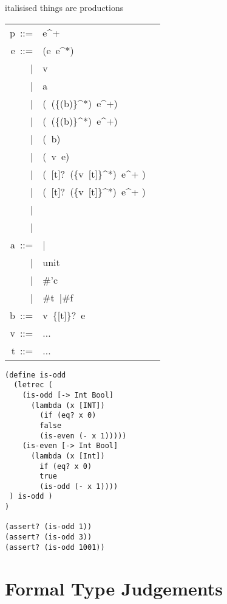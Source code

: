 \documentclass[12pt]{report}
\begin{document}
italisised things are productions
\begin{longtable}{RLR}
      p\ ::= &e^+&\\
      e\ ::= &(e\ e^*)&\\
        |&v&\\
        |&a&\\
        |&(\ (\{(b)\}^*)\ e^+)&\\
        |&(\ (\{(b)\}^*)\ e^+)&\\
        |&(\ b)&\\
        |&(\ v\ e)&\\
        |&(\ [t]?\ (\{v\ [t]\}^*)\ e^+ )&\\
        |&(\ [t]?\ (\{v\ [t]\}^*)\ e^+ )&\\
        |& & \\
        |& & \\
        a\ ::=& | \\
            |& unit &\\
            |& \#'c & \\
            |& \#t\ |\#f & \\
         b\ ::= &v\ \{[t]\}?\ e & \\
         v\ ::= & ... &\\
         t\ ::= & ... &
\end{longtable}
\begin{lstlisting}[caption={An example program}]
(define is-odd
  (letrec (
    (is-odd [-> Int Bool]
      (lambda (x [INT])
        (if (eq? x 0)
        false
        (is-even (- x 1)))))
    (is-even [-> Int Bool]
      (lambda (x [Int])
        if (eq? x 0)
        true
        (is-odd (- x 1))))
 ) is-odd )
)

(assert? (is-odd 1))
(assert? (is-odd 3))
(assert? (is-odd 1001))
\end{lstlisting}
\section{Formal Type Judgements}
\end{document}
